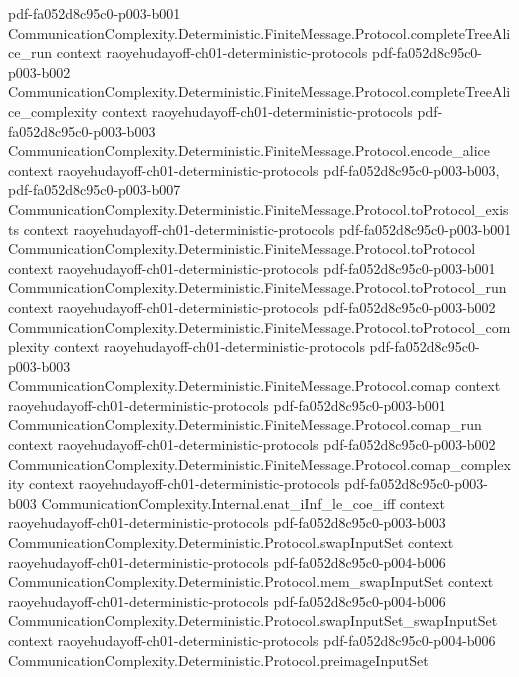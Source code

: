 \begin{lemma}
  {pdf-fa052d8c95c0-p003-b001}
\proofstep
  {CommunicationComplexity.Deterministic.FiniteMessage.Protocol.completeTreeAlice_run}
  {context}
  {raoyehudayoff-ch01-deterministic-protocols}
  {pdf-fa052d8c95c0-p003-b002}
\proofstep
  {CommunicationComplexity.Deterministic.FiniteMessage.Protocol.completeTreeAlice_complexity}
  {context}
  {raoyehudayoff-ch01-deterministic-protocols}
  {pdf-fa052d8c95c0-p003-b003}
\proofstep
  {CommunicationComplexity.Deterministic.FiniteMessage.Protocol.encode_alice}
  {context}
  {raoyehudayoff-ch01-deterministic-protocols}
  {pdf-fa052d8c95c0-p003-b003,
    pdf-fa052d8c95c0-p003-b007}
\proofstep
  {CommunicationComplexity.Deterministic.FiniteMessage.Protocol.toProtocol_exists}
  {context}
  {raoyehudayoff-ch01-deterministic-protocols}
  {pdf-fa052d8c95c0-p003-b001}
\proofstep
  {CommunicationComplexity.Deterministic.FiniteMessage.Protocol.toProtocol}
  {context}
  {raoyehudayoff-ch01-deterministic-protocols}
  {pdf-fa052d8c95c0-p003-b001}
\proofstep
  {CommunicationComplexity.Deterministic.FiniteMessage.Protocol.toProtocol_run}
  {context}
  {raoyehudayoff-ch01-deterministic-protocols}
  {pdf-fa052d8c95c0-p003-b002}
\proofstep
  {CommunicationComplexity.Deterministic.FiniteMessage.Protocol.toProtocol_complexity}
  {context}
  {raoyehudayoff-ch01-deterministic-protocols}
  {pdf-fa052d8c95c0-p003-b003}
\proofstep
  {CommunicationComplexity.Deterministic.FiniteMessage.Protocol.comap}
  {context}
  {raoyehudayoff-ch01-deterministic-protocols}
  {pdf-fa052d8c95c0-p003-b001}
\proofstep
  {CommunicationComplexity.Deterministic.FiniteMessage.Protocol.comap_run}
  {context}
  {raoyehudayoff-ch01-deterministic-protocols}
  {pdf-fa052d8c95c0-p003-b002}
\proofstep
  {CommunicationComplexity.Deterministic.FiniteMessage.Protocol.comap_complexity}
  {context}
  {raoyehudayoff-ch01-deterministic-protocols}
  {pdf-fa052d8c95c0-p003-b003}
\proofstep
  {CommunicationComplexity.Internal.enat_iInf_le_coe_iff}
  {context}
  {raoyehudayoff-ch01-deterministic-protocols}
  {pdf-fa052d8c95c0-p003-b003}
\proofstep
  {CommunicationComplexity.Deterministic.Protocol.swapInputSet}
  {context}
  {raoyehudayoff-ch01-deterministic-protocols}
  {pdf-fa052d8c95c0-p004-b006}
\proofstep
  {CommunicationComplexity.Deterministic.Protocol.mem_swapInputSet}
  {context}
  {raoyehudayoff-ch01-deterministic-protocols}
  {pdf-fa052d8c95c0-p004-b006}
\proofstep
  {CommunicationComplexity.Deterministic.Protocol.swapInputSet_swapInputSet}
  {context}
  {raoyehudayoff-ch01-deterministic-protocols}
  {pdf-fa052d8c95c0-p004-b006}
\proofstep
  {CommunicationComplexity.Deterministic.Protocol.preimageInputSet}

\end{lemma}
